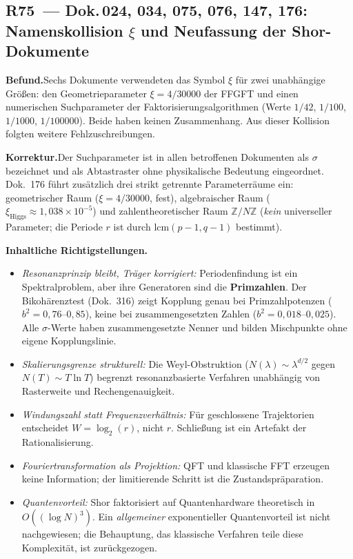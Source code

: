 \subsection*{R75~--- Dok.\,024, 034, 075, 076, 147, 176: Namenskollision $\xi$
und Neufassung der Shor-Dokumente}

\smallskip\noindent\textbf{Befund.}\quad Sechs Dokumente verwendeten das Symbol
$\xi$ für zwei unabh\"angige Gr\"o\ss en: den Geometrieparameter
$\xi = 4/30000$ der FFGFT und einen numerischen Suchparameter der
Faktorisierungsalgorithmen (Werte $1/42$, $1/100$, $1/1000$, $1/100000$).
Beide haben keinen Zusammenhang. Aus dieser Kollision folgten weitere
Fehlzuschreibungen.

\smallskip\noindent\textbf{Korrektur.}\quad Der Suchparameter ist in allen
betroffenen Dokumenten als $\sigma$ bezeichnet und als Abtastraster ohne
physikalische Bedeutung eingeordnet. Dok.~176 f\"uhrt zus\"atzlich drei strikt
getrennte Parameterr\"aume ein: geometrischer Raum ($\xi = 4/30000$, fest),
algebraischer Raum ($\xi_{\text{Higgs}} \approx 1{,}038\times10^{-5}$) und
zahlentheoretischer Raum $\mathbb{Z}/N\mathbb{Z}$ (\emph{kein} universeller
Parameter; die Periode $r$ ist durch $\mathrm{lcm}(p-1,q-1)$ bestimmt).

\smallskip\noindent\textbf{Inhaltliche Richtigstellungen.}
\begin{itemize}
  \item \emph{Resonanzprinzip bleibt, Tr\"ager korrigiert:} Periodenfindung ist
    ein Spektralproblem, aber ihre Generatoren sind die \textbf{Primzahlen}.
    Der Bikoh\"arenztest (Dok.~316) zeigt Kopplung genau bei Primzahlpotenzen
    ($b^2 = 0{,}76$--$0{,}85$), keine bei zusammengesetzten Zahlen
    ($b^2 = 0{,}018$--$0{,}025$). Alle $\sigma$-Werte haben zusammengesetzte
    Nenner und bilden Mischpunkte ohne eigene Kopplungslinie.
  \item \emph{Skalierungsgrenze strukturell:} Die Weyl-Obstruktion
    ($N(\lambda) \sim \lambda^{d/2}$ gegen $N(T) \sim T\ln T$) begrenzt
    resonanzbasierte Verfahren unabh\"angig von Rasterweite und
    Rechengenauigkeit.
  \item \emph{Windungszahl statt Frequenzverh\"altnis:} F\"ur geschlossene
    Trajektorien entscheidet $W = \log_2(r)$, nicht $r$. Schlie\ss ung ist ein
    Artefakt der Rationalisierung.
  \item \emph{Fouriertransformation als Projektion:} QFT und klassische FFT
    erzeugen keine Information; der limitierende Schritt ist die
    Zustandspr\"aparation.
  \item \emph{Quantenvorteil:} Shor faktorisiert auf Quantenhardware
    theoretisch in $O((\log N)^3)$. Ein \emph{allgemeiner} exponentieller
    Quantenvorteil ist nicht nachgewiesen; die Behauptung, das klassische
    Verfahren teile diese Komplexit\"at, ist zur\"uckgezogen.
\end{itemize}

